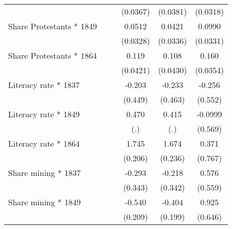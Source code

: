 {\begin{tabular}{l*{5}{c}}
                    &                     &                     &    (0.0367)         &    (0.0381)         &    (0.0318)         \\
Share Protestants * 1849&                     &                     &      0.0512         &      0.0421         &      0.0990\sym{***}\\
                    &                     &                     &    (0.0328)         &    (0.0336)         &    (0.0331)         \\
Share Protestants * 1864&                     &                     &       0.119\sym{***}&       0.108\sym{**} &       0.160\sym{***}\\
                    &                     &                     &    (0.0421)         &    (0.0430)         &    (0.0354)         \\
Literacy rate * 1837&                     &                     &      -0.203         &      -0.233         &      -0.256         \\
                    &                     &                     &     (0.449)         &     (0.463)         &     (0.552)         \\
Literacy rate * 1849&                     &                     &       0.470         &       0.415         &     -0.0999         \\
                    &                     &                     &         (.)         &         (.)         &     (0.569)         \\
Literacy rate * 1864&                     &                     &       1.745\sym{***}&       1.674\sym{***}&       0.371         \\
                    &                     &                     &     (0.206)         &     (0.236)         &     (0.767)         \\
Share mining * 1837 &                     &                     &      -0.293         &      -0.218         &       0.576         \\
                    &                     &                     &     (0.343)         &     (0.342)         &     (0.559)         \\
Share mining * 1849 &                     &                     &      -0.540\sym{***}&      -0.404\sym{**} &       0.925         \\
                    &                     &                     &     (0.209)         &     (0.199)         &     (0.646)         \\

\end{tabular}}
